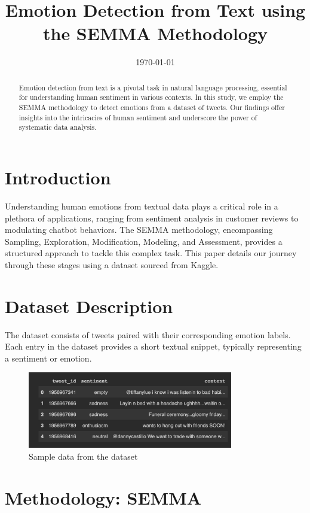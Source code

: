 \documentclass[12pt]{article}
\title{Emotion Detection from Text using the SEMMA Methodology}
\date{\today}
\begin{document}
\maketitle

\begin{abstract}
Emotion detection from text is a pivotal task in natural language processing, essential for understanding human sentiment in various contexts. In this study, we employ the SEMMA methodology to detect emotions from a dataset of tweets. Our findings offer insights into the intricacies of human sentiment and underscore the power of systematic data analysis.
\end{abstract}

\section{Introduction}
Understanding human emotions from textual data plays a critical role in a plethora of applications, ranging from sentiment analysis in customer reviews to modulating chatbot behaviors. The SEMMA methodology, encompassing Sampling, Exploration, Modification, Modeling, and Assessment, provides a structured approach to tackle this complex task. This paper details our journey through these stages using a dataset sourced from Kaggle.

\section{Dataset Description}
The dataset consists of tweets paired with their corresponding emotion labels. Each entry in the dataset provides a short textual snippet, typically representing a sentiment or emotion.

\begin{figure}[h]
\centering
\includegraphics[width=0.8\textwidth]{path_to_sample_data.png}
\caption{Sample data from the dataset}
\end{figure}

\section{Methodology: SEMMA}
\end{document}
